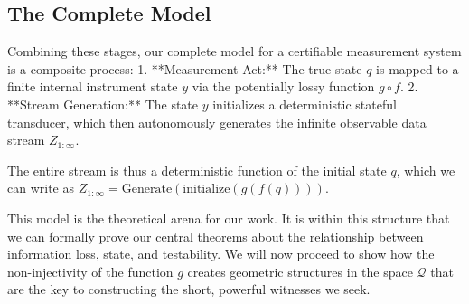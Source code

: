 \documentclass[12pt]{article}
\theoremstyle{definition}
\begin{document}
\subsection{The Complete Model}

Combining these stages, our complete model for a certifiable measurement system is a composite process:
1.  **Measurement Act:** The true state $q$ is mapped to a finite internal instrument state $y$ via the potentially lossy function $g \circ f$.
2.  **Stream Generation:** The state $y$ initializes a deterministic stateful transducer, which then autonomously generates the infinite observable data stream $Z_{1:\infty}$.

The entire stream is thus a deterministic function of the initial state $q$, which we can write as $Z_{1:\infty} = \text{Generate}( \text{initialize}( g(f(q)) ) )$.

This model is the theoretical arena for our work. It is within this structure that we can formally prove our central theorems about the relationship between information loss, state, and testability. We will now proceed to show how the non-injectivity of the function $g$ creates geometric structures in the space $\mathcal{Q}$ that are the key to constructing the short, powerful witnesses we seek.
\end{document}
